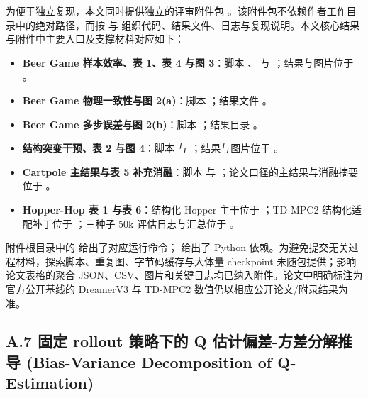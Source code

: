 \documentclass[UTF8]{ctexart}
\begin{document}
为便于独立复现，本文同时提供独立的评审附件包
。该附件包不依赖作者工作目录中的绝对路径，而按
 与 
组织代码、结果文件、日志与复现说明。本文核心结果与附件中主要入口及支撑材料对应如下：
\begin{itemize}
\item \textbf{Beer Game 样本效率、表 1、表 4 与图 3}：脚本
、
 与
；结果与图片位于
。
\item \textbf{Beer Game 物理一致性与图 2(a)}：脚本
；结果文件
。
\item \textbf{Beer Game 多步误差与图 2(b)}：脚本
；结果目录
。
\item \textbf{结构突变干预、表 2 与图 4}：脚本
 与
；结果与图片位于
。
\item \textbf{Cartpole 主结果与表 5 补充消融}：脚本
 与
；论文口径的主结果与消融摘要位于
。
\item \textbf{Hopper-Hop 表 1 与表 6}：结构化 Hopper 主干位于
；TD-MPC2
结构化适配补丁位于 ；三种子
50k 评估日志与汇总位于
。
\end{itemize}

附件根目录中的  给出了对应运行命令；
 给出了 Python 依赖。为避免提交无关过程材料，探索脚本、重复图、字节码缓存与大体量 checkpoint 未随包提供；影响论文表格的聚合
JSON、CSV、图片和关键日志均已纳入附件。论文中明确标注为官方公开基线的 DreamerV3 与
TD-MPC2 数值仍以相应公开论文/附录结果为准。

\hypertarget{a.7-q-ux4f30ux8ba1ux7684-bias-variance-ux5206ux89e3ux63a8ux5bfc-bias-variance-decomposition-of-q-estimation}{%
\subsection{A.7 固定 rollout 策略下的 Q 估计偏差-方差分解推导 (Bias-Variance
Decomposition of
Q-Estimation)}\label{a.7-q-ux4f30ux8ba1ux7684-bias-variance-ux5206ux89e3ux63a8ux5bfc-bias-variance-decomposition-of-q-estimation}}
\end{document}
